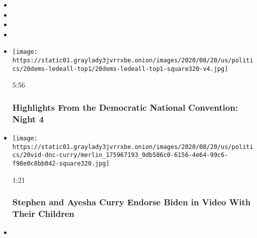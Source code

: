 \begin{itemize}
\item
\item
\item
\item
\end{itemize}

\begin{itemize}
\item
  \href{https://www.nytimes3xbfgragh.onion/video/us/politics/100000007299516/democratic-national-convention-highlights.html?action=click\&module=video-series-bar\&region=header\&pgtype=Article\&playlistId=video/2020-Elections}{}

  \texttt{[image: https://static01.graylady3jvrrxbe.onion/images/2020/08/20/us/politics/20dems-ledeall-top1/20dems-ledeall-top1-square320-v4.jpg]}

  5:56

  \hypertarget{highlights-from-the-democratic-national-convention-night-4}{%
  \subsubsection{Highlights From the Democratic National Convention:
  Night
  4}\label{highlights-from-the-democratic-national-convention-night-4}}
\item
  \href{https://www.nytimes3xbfgragh.onion/video/us/elections/100000007299782/stephen-curry-speaks-dnc.html?action=click\&module=video-series-bar\&region=header\&pgtype=Article\&playlistId=video/2020-Elections}{}

  \texttt{[image: https://static01.graylady3jvrrxbe.onion/images/2020/08/20/us/politics/20vid-dnc-curry/merlin\_175967193\_9db586c0-6156-4e64-99c6-f98e0c8bb042-square320.jpg]}

  1:21

  \hypertarget{stephen-and-ayesha-curry-endorse-biden-in-video-with-their-children}{%
  \subsubsection{Stephen and Ayesha Curry Endorse Biden in Video With
  Their
  Children}\label{stephen-and-ayesha-curry-endorse-biden-in-video-with-their-children}}
\item
  \href{https://www.nytimes3xbfgragh.onion/video/us/elections/100000007299879/joe-biden-full-speech.html?action=click\&module=video-series-bar\&region=header\&pgtype=Article\&playlistId=video/2020-Elections}{}


\end{itemize}
